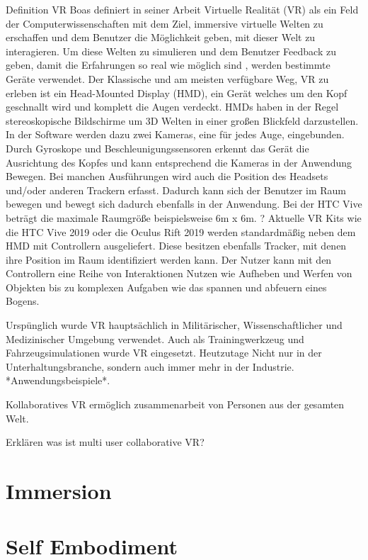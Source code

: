 Definition VR
Boas definiert in  seiner Arbeit \cite{Boas2012} Virtuelle Realität (VR) als ein Feld der Computerwissenschaften mit dem Ziel, immersive virtuelle Welten zu erschaffen und dem Benutzer die Möglichkeit geben, mit dieser Welt zu interagieren. Um diese Welten zu simulieren und dem Benutzer Feedback zu geben, damit die Erfahrungen so real wie möglich sind , werden bestimmte Geräte verwendet.
Der Klassische und am meisten verfügbare Weg, VR zu erleben ist ein Head-Mounted Display (HMD), ein Gerät welches um den Kopf geschnallt wird und komplett die Augen verdeckt. HMDs haben in der Regel stereoskopische Bildschirme um 3D Welten in einer großen Blickfeld darzustellen. In der Software werden dazu zwei Kameras, eine für jedes Auge, eingebunden. Durch Gyroskope und Beschleunigungssensoren erkennt das Gerät die Ausrichtung des Kopfes und kann entsprechend die Kameras in der Anwendung Bewegen. Bei manchen Ausführungen wird auch die Position des Headsets und/oder anderen Trackern erfasst. Dadurch kann sich der Benutzer im Raum bewegen und bewegt sich dadurch ebenfalls in der Anwendung. \cite{Boas2012}\cite{Holloway1995} Bei der HTC Vive beträgt die maximale Raumgröße beispielsweise 6m x 6m. ?
Aktuelle VR Kits wie die HTC Vive 2019 oder die Oculus Rift 2019 werden standardmäßig neben dem HMD mit Controllern ausgeliefert. Diese besitzen ebenfalls Tracker, mit denen ihre Position im Raum identifiziert werden kann. Der Nutzer kann mit den Controllern eine Reihe von Interaktionen Nutzen wie Aufheben und Werfen von Objekten bis zu komplexen Aufgaben wie das spannen und abfeuern eines Bogens.

Urspünglich wurde VR hauptsächlich in Militärischer, Wissenschaftlicher und Medizinischer Umgebung verwendet. Auch als Trainingwerkzeug und Fahrzeugsimulationen wurde VR eingesetzt. Heutzutage 
 Nicht nur in der Unterhaltungsbranche, sondern auch immer mehr in der Industrie.\cite{Ragan2010} *Anwendungsbeispiele*.
 
Kollaboratives VR ermöglich zusammenarbeit von Personen aus der gesamten Welt.

Erklären was ist multi user collaborative VR?

\section{Immersion}

\cite{Boas2012}

\section{Self Embodiment}

